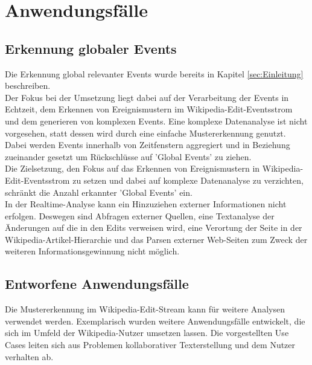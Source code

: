 \section{Anwendungsfälle}
\subsection{Erkennung globaler Events}
Die Erkennung global relevanter Events wurde bereits in Kapitel \ref{sec:Einleitung} beschreiben.\\

Der Fokus bei der Umsetzung liegt dabei auf der Verarbeitung der Events in Echtzeit, dem Erkennen von Ereignismustern im Wikipedia-Edit-Eventsstrom und dem generieren von komplexen Events. Eine komplexe Datenanalyse ist nicht vorgesehen, statt dessen wird durch eine einfache Mustererkennung genutzt. Dabei werden Events innerhalb von Zeitfenstern aggregiert und in Beziehung zueinander gesetzt um Rückschlüsse auf 'Global Events' zu ziehen.\\

Die Zielsetzung, den Fokus auf das Erkennen von Ereignismustern in Wikipedia-Edit-Eventsstrom zu setzen und dabei auf komplexe Datenanalyse zu verzichten, schränkt die Anzahl erkannter 'Global Events' ein.\\

In der Realtime-Analyse kann ein Hinzuziehen externer Informationen nicht erfolgen. Deswegen sind Abfragen externer Quellen, eine Textanalyse der Änderungen auf die in den Edits verweisen wird, eine Verortung der Seite in der Wikipedia-Artikel-Hierarchie und das Parsen externer Web-Seiten zum Zweck der weiteren Informationsgewinnung nicht möglich. 



\subsection{Entworfene Anwendungsfälle}
Die Mustererkennung im Wikipedia-Edit-Stream kann für weitere Analysen verwendet werden. Exemplarisch wurden weitere Anwendungsfälle entwickelt, die sich im Umfeld der Wikipedia-Nutzer umsetzen lassen. Die vorgestellten Use Cases leiten sich aus Problemen kollaborativer Texterstellung und dem Nutzer verhalten ab.

